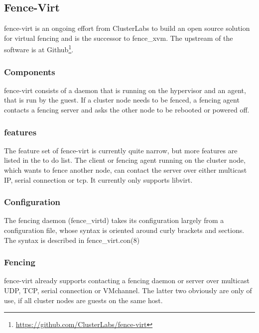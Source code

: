 \subsection{Fence-Virt}
fence-virt is an ongoing effort from ClusterLabs to build an open source solution
for virtual fencing and is the successor to fence\_xvm. 
The upstream of the software is at Github\footnote{\url{https://github.com/ClusterLabs/fence-virt}}.
\subsubsection{Components}
fence-virt consists of a daemon that is running on the hypervisor and 
an agent, that is run by the guest. If a cluster node needs to be fenced,
a fencing agent contacts a fencing server and asks the other node to
be rebooted or powered off.
\subsubsection{features}
The feature set of fence-virt is currently quite narrow, but more features are listed
in the to do list.
The client or fencing agent running on the cluster node, which wants to fence
another node, can contact the server over either multicast IP, serial connection or
tcp. It currently only supports libvirt.
\subsubsection{Configuration}
The fencing daemon (fence_virtd) takes its configuration largely from
a configuration file, whose syntax is oriented around curly brackets and 
sections. The syntax is described in fence_virt.con(8)
\subsubsection{Fencing}
fence-virt already supports contacting a fencing daemon or server over
multicast UDP, TCP, serial connection or VMchannel. The latter two obviously are only
of use, if all cluster nodes are guests on the same host.

